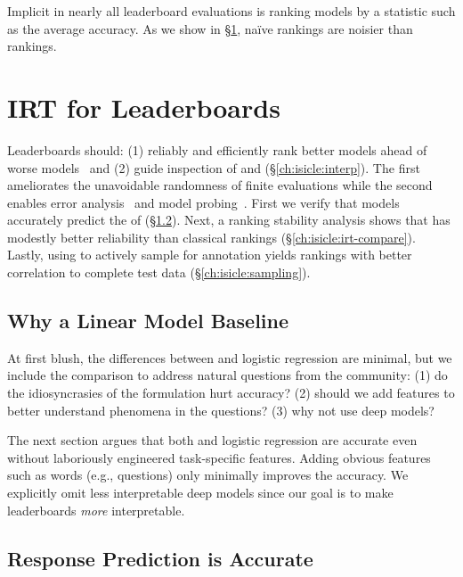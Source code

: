 \label{ch:isicle:agg}


Implicit in nearly all leaderboard evaluations is ranking models by a
statistic such as the average accuracy.
As we show in \S\ref{ch:isicle:exp}, na\"ive rankings are noisier than \irt{} rankings.
\section{IRT for Leaderboards}
\label{ch:isicle:exp}

Leaderboards should: (1) reliably and efficiently rank
better models ahead of worse
models~\citep{sutcliffe1992pragmatics,voorhees2003evaluating} and (2)
guide inspection of \itms{} and \subjs{} (\S\ref{ch:isicle:interp}).
The first ameliorates the unavoidable randomness
of finite evaluations while the second enables
error analysis~\citep{wu2019errudite} and model
probing~\citep{belinkov2019survey,zhang2019manifold}.
First we verify that \irt{} models accurately predict the \resps{} of
\subjs{} (\S\ref{ch:isicle:irt-accurate}).
Next, a ranking stability analysis shows that \irt{} has
modestly better reliability than classical rankings
(\S\ref{ch:isicle:irt-compare}).
Lastly, using \irt{} to actively sample \itms{} for annotation yields
rankings with better correlation to complete test data
(\S\ref{ch:isicle:sampling}).

\subsection{Why a Linear Model Baseline}

At first blush, the differences between \irt{} and logistic regression
are minimal, but we include the comparison to address natural
questions from the  community:
(1) do the idiosyncrasies of the \irt{} formulation hurt
accuracy?
(2) should we add features to better understand phenomena
in the questions?
(3) why not use deep models?

The next section argues that both \irt{} and logistic regression are
accurate even without laboriously engineered task-specific features.
Adding obvious features such as \itm{} words (e.g., questions)
only minimally improves the accuracy.
We explicitly omit less interpretable deep models since our goal is to
make leaderboards \emph{more} interpretable.

\subsection{Response Prediction is Accurate}
\label{ch:isicle:irt-accurate}


